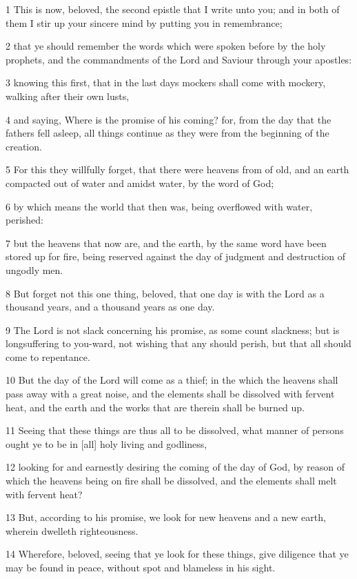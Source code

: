 \par 1 This is now, beloved, the second epistle that I write unto you; and in both of them I stir up your sincere mind by putting you in remembrance;
\par 2 that ye should remember the words which were spoken before by the holy prophets, and the commandments of the Lord and Saviour through your apostles:
\par 3 knowing this first, that in the last days mockers shall come with mockery, walking after their own lusts,
\par 4 and saying, Where is the promise of his coming? for, from the day that the fathers fell asleep, all things continue as they were from the beginning of the creation.
\par 5 For this they willfully forget, that there were heavens from of old, and an earth compacted out of water and amidst water, by the word of God;
\par 6 by which means the world that then was, being overflowed with water, perished:
\par 7 but the heavens that now are, and the earth, by the same word have been stored up for fire, being reserved against the day of judgment and destruction of ungodly men.
\par 8 But forget not this one thing, beloved, that one day is with the Lord as a thousand years, and a thousand years as one day.
\par 9 The Lord is not slack concerning his promise, as some count slackness; but is longsuffering to you-ward, not wishing that any should perish, but that all should come to repentance.
\par 10 But the day of the Lord will come as a thief; in the which the heavens shall pass away with a great noise, and the elements shall be dissolved with fervent heat, and the earth and the works that are therein shall be burned up.
\par 11 Seeing that these things are thus all to be dissolved, what manner of persons ought ye to be in [all] holy living and godliness,
\par 12 looking for and earnestly desiring the coming of the day of God, by reason of which the heavens being on fire shall be dissolved, and the elements shall melt with fervent heat?
\par 13 But, according to his promise, we look for new heavens and a new earth, wherein dwelleth righteousness.
\par 14 Wherefore, beloved, seeing that ye look for these things, give diligence that ye may be found in peace, without spot and blameless in his sight.
